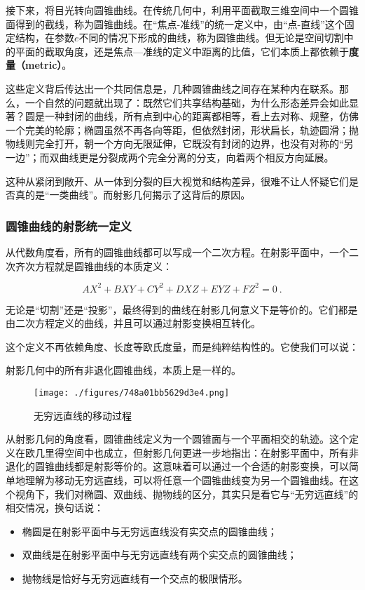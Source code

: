 接下来，将目光转向圆锥曲线。在传统几何中，利用平面截取三维空间中一个圆锥面得到的截线，称为圆锥曲线。在“焦点-准线”的统一定义中，由“点-直线”这个固定结构，在参数$e$不同的情况下形成的曲线，称为圆锥曲线。但无论是空间切割中的平面的截取角度，还是焦点—准线的定义中距离的比值，它们本质上都依赖于\textbf{度量（metric）}。

这些定义背后传达出一个共同信息是，几种圆锥曲线之间存在某种内在联系。那么，一个自然的问题就出现了：既然它们共享结构基础，为什么形态差异会如此显著？圆是一种封闭的曲线，所有点到中心的距离都相等，看上去对称、规整，仿佛一个完美的轮廓；椭圆虽然不再各向等距，但依然封闭，形状扁长，轨迹圆滑；抛物线则完全打开，朝一个方向无限延伸，它既没有封闭的边界，也没有对称的“另一边”；而双曲线更是分裂成两个完全分离的分支，向着两个相反方向延展。

这种从紧闭到敞开、从一体到分裂的巨大视觉和结构差异，很难不让人怀疑它们是否真的是“一类曲线”。而射影几何揭示了这背后的原因。

\subsubsection{圆锥曲线的射影统一定义}

从代数角度看，所有的圆锥曲线都可以写成一个二次方程。在射影平面中，一个二次齐次方程就是圆锥曲线的本质定义：

\begin{equation}
AX^2 + BXY + CY^2 + DXZ + EYZ + FZ^2 = 0~.
\end{equation}

无论是“切割”还是“投影”，最终得到的曲线在射影几何意义下是等价的。它们都是由二次方程定义的曲线，并且可以通过射影变换相互转化。

这个定义不再依赖角度、长度等欧氏度量，而是纯粹结构性的。它使我们可以说：

射影几何中的所有非退化圆锥曲线，本质上是一样的。

\begin{figure}[ht]
\centering
\texttt{[image: ./figures/748a01bb5629d3e4.png]}
\caption{无穷远直线的移动过程} \label{fig_HsPGCC_3}
\end{figure}

从射影几何的角度看，圆锥曲线定义为一个圆锥面与一个平面相交的轨迹。这个定义在欧几里得空间中也成立，但射影几何更进一步地指出：在射影平面中，所有非退化的圆锥曲线都是射影等价的。这意味着可以通过一个合适的射影变换，可以简单地理解为移动无穷远直线，可以将任意一个圆锥曲线变为另一个圆锥曲线。在这个视角下，我们对椭圆、双曲线、抛物线的区分，其实只是看它与“无穷远直线”的相交情况，换句话说：
\begin{itemize}
\item 椭圆是在射影平面中与无穷远直线没有实交点的圆锥曲线；
\item 双曲线是在射影平面中与无穷远直线有两个实交点的圆锥曲线；
\item 抛物线是恰好与无穷远直线有一个交点的极限情形。
\end{itemize}

